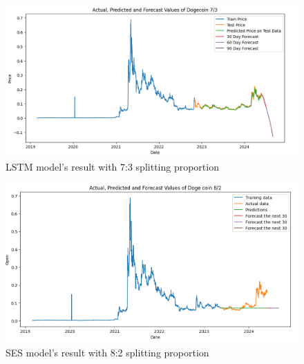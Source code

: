 \documentclass{ieeeojies}
\begin{document}
\vspace{-5mm}
\begin{figure}[H]
  \centering
  \begin{minipage}{0.8\linewidth}
    \centering
    \includegraphics[width=\linewidth]{Image/LSTM/LSTM_DOGE_73.png}
    \caption{LSTM model's result with 7:3 splitting proportion}
    \label{fig:25}
  \end{minipage}
\end{figure}
\vspace{-5mm}
\begin{figure}[H]
  \centering
  \begin{minipage}{0.8\linewidth}
    \centering
    \includegraphics[width=\linewidth]{Image/SES/SES_DOGE_82.png}
    \caption{SES model's result with 8:2 splitting proportion}
    \label{fig:26}
  \end{minipage}
\end{figure}
\vspace{-5mm}
\end{document}
